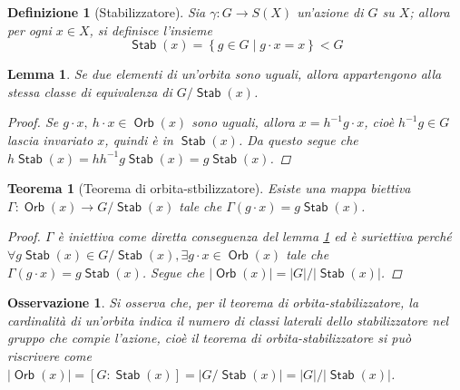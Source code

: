 \documentclass[11pt]{scrartcl}
\theoremstyle{style1}
\newtheorem{osservazione}{Osservazione}[section]
\newtheorem{teorema}{Teorema}[section]
\newtheorem{lemma}{Lemma}[teorema]
\newtheorem{definizione}{Definizione}[section]
\numberwithin{equation}{subsection}
\renewcommand{\operatorname}[1]{\mathop{\mathrm{\textsf{#1}}}}
\begin{document}
\begin{definizione}
	[Stabilizzatore]
	Sia $\gamma: G \to S(X)$ un'azione di $G$ su $X$; allora per ogni $x \in X$, si definisce l'insieme 
	\[
	\operatorname{Stab} (x) = \left\{ g \in G  \mid g \cdot  x = x \right\} < G 
	\] 	
\end{definizione}
\begin{lemma}\label{l111}
Se due elementi di un'orbita sono uguali, allora appartengono alla stessa classe di equivalenza di $G / \operatorname{Stab} (x)$.
\begin{proof}
	Se $g \cdot x, \ h\cdot x \in \operatorname{Orb} (x)$ sono uguali, allora $x =h^{-1} g \cdot x $, cio\`e $h^{-1} g \in G$ lascia invariato $x$, quindi \`e in $\operatorname{Stab} (x)$.
	Da questo segue che $h \operatorname{Stab} (x) = h h^{-1} g \operatorname{Stab} (x) = g \operatorname{Stab} (x)$.
\end{proof}
\end{lemma}
\begin{teorema}[Teorema di orbita-stbilizzatore]\label{osth}
	Esiste una mappa biettiva $\Gamma : \operatorname{Orb} (x) \to G / \operatorname{Stab} (x)$ tale che $\Gamma(g \cdot x) = g \operatorname{Stab} (x)$.
	\begin{proof}
		$\Gamma$ \`e iniettiva come diretta conseguenza del lemma \ref{l111} ed \`e suriettiva perch\'e $\forall g \operatorname{Stab} (x) \in G / \operatorname{Stab} (x), \exists g\cdot x \in \operatorname{Orb} (x)$ tale che $\Gamma(g\cdot x) = g \operatorname{Stab} (x)$.
		Segue che $\lvert \operatorname{Orb} (x)  \rvert = \lvert G \rvert / \lvert \operatorname{Stab} (x) \rvert $.
	\end{proof}
\end{teorema}
\begin{osservazione}
Si osserva che, per il teorema di orbita-stabilizzatore, la cardinalit\`a di un'orbita indica il numero di classi laterali dello stabilizzatore nel gruppo che compie l'azione, cio\`e il teorema di orbita-stabilizzatore si pu\`o riscrivere come $\lvert \operatorname{Orb} (x) \rvert = [G: \operatorname{Stab} (x)] = \lvert G / \operatorname{Stab} (x) \rvert = \lvert G \rvert / \lvert \operatorname{Stab} (x) \rvert $.
\end{osservazione}
\end{document}
